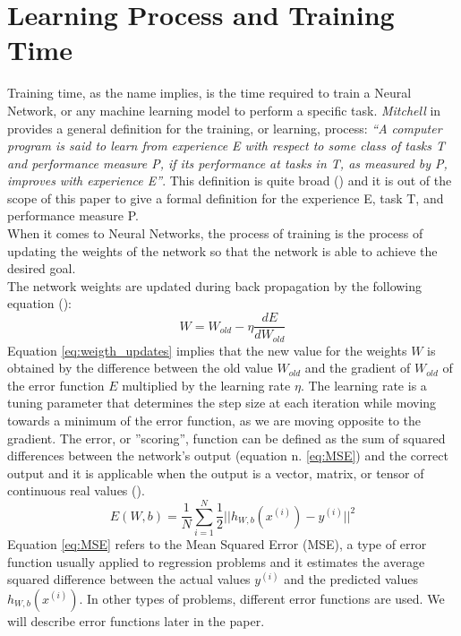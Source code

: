 \section{Learning Process and Training Time}\label{sec:training_time}
Training time, as the name implies, is the time required to train a Neural Network, or any machine learning model to perform a specific task. \textit{Mitchell} in \cite{machine_learning} provides a general definition for the training, or learning, process: \textit{“A computer program is said to learn from experience E with respect to some class of tasks T and performance measure P, if its performance at tasks in T, as measured by P, improves with experience E”}. This definition is quite broad (\cite{Goodfellow-et-al-2016}) and it is out of the scope of this paper to give a formal definition for the experience E, task T, and performance measure P.\\When it comes to Neural Networks, the process of training is the process of updating the weights of the network so that the network is able to achieve the desired goal. \cite{murphy2016overview} \\
The network weights are updated during back propagation by the following equation (\cite{murphy2016overview}):
\begin{equation}
W = W_{old} - \eta \frac{dE}{dW_{old}}
\label{eq:weigth_updates}
\end{equation}
Equation \ref{eq:weigth_updates} implies that the new value for the weights $W$ is obtained by the difference between the old value $W_{old}$ and the gradient of $W_{old}$ of the error function $E$ multiplied by the learning rate $\eta$. The learning rate is a tuning parameter that determines the step size at each iteration while moving towards a minimum of the error function, as we are moving opposite to the gradient. 
The error, or ''scoring'', function can be defined as the sum of squared differences between the network's output (equation n. \ref{eq:MSE}) and the correct output and it is applicable when the output is a vector, matrix, or tensor of continuous real values (\cite{murphy2016overview}). 
\begin{equation}
E(W,b) = \frac{1}{N} \sum_{i=1}^{N} \frac{1}{2} \vert \vert h_{W,b} (x^{(i)}) - y^{(i)} \vert \vert ^{2}
\label{eq:MSE}
\end{equation}
Equation \ref{eq:MSE} refers to the Mean Squared Error (MSE), a type of error function usually applied to regression problems and it estimates the average squared difference between the actual values $y^{(i)}$ and the predicted values $h_{W,b} (x^{(i)})$. In other types of problems, different error functions are used. We will describe error functions later in the paper. \\
